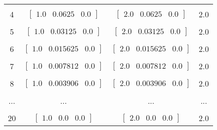 \documentclass[a4paper,11pt]{article}
\begin{document}
\begin{enumerate}[label=\textbf{(\alph*)}]
\begin{center}
\begin{tabular}{ | c | c | c | c | }
                    \hline
                    & & & \\ [-1em]
                    4  & $\begin{bmatrix} 1.0 & 0.0625 & 0.0 \end{bmatrix}$ & $\begin{bmatrix} 2.0 & 0.0625 & 0.0 \end{bmatrix}$  & 2.0 \\ [+.5em]
                    \hline
                    & & & \\ [-1em]
                    5  & $\begin{bmatrix} 1.0 & 0.03125 & 0.0 \end{bmatrix}$ & $\begin{bmatrix} 2.0 & 0.03125 & 0.0 \end{bmatrix}$  & 2.0 \\ [+.5em]
                    \hline
                    & & & \\ [-1em]
                    6  & $\begin{bmatrix} 1.0 & 0.015625 & 0.0 \end{bmatrix}$ & $\begin{bmatrix} 2.0 & 0.015625 & 0.0 \end{bmatrix}$  & 2.0 \\ [+.5em]
                    \hline
                    & & & \\ [-1em]
                    7  & $\begin{bmatrix} 1.0 & 0.007812 & 0.0 \end{bmatrix}$ & $\begin{bmatrix} 2.0 & 0.007812 & 0.0 \end{bmatrix}$  & 2.0 \\ [+.5em]
                    \hline
                    & & & \\ [-1em]
                    8  & $\begin{bmatrix} 1.0 & 0.003906 & 0.0 \end{bmatrix}$ & $\begin{bmatrix} 2.0 & 0.003906 & 0.0 \end{bmatrix}$  & 2.0 \\ [+.5em]
                    \hline
                    & & & \\ [-1em]
                    ...  & ... & ...  & ... \\ [+.5em]
                    \hline
                    & & & \\ [-1em]
                    20  & $\begin{bmatrix} 1.0 & 0.0 & 0.0 \end{bmatrix}$ & $\begin{bmatrix} 2.0 & 0.0 & 0.0 \end{bmatrix}$  & 2.0 \\ [+.5em]
                    \hline
                \end{tabular}
            \end{center}


\end{enumerate}
\end{document}
